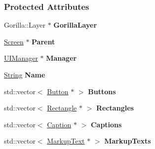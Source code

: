 \subsubsection*{Protected Attributes}
\begin{DoxyCompactItemize}
\item 
\hypertarget{classphys_1_1UI_1_1Layer_a2070c97455f89015d36f2c84f4153369}{
Gorilla::Layer $\ast$ {\bfseries GorillaLayer}}
\label{classphys_1_1UI_1_1Layer_a2070c97455f89015d36f2c84f4153369}

\item 
\hypertarget{classphys_1_1UI_1_1Layer_a1339f7386d3540d6025417d3d2d5c6e3}{
\hyperlink{classphys_1_1UI_1_1Screen}{Screen} $\ast$ {\bfseries Parent}}
\label{classphys_1_1UI_1_1Layer_a1339f7386d3540d6025417d3d2d5c6e3}

\item 
\hypertarget{classphys_1_1UI_1_1Layer_a7f735d502a8673b9faff0cbe773392c5}{
\hyperlink{classphys_1_1UIManager}{UIManager} $\ast$ {\bfseries Manager}}
\label{classphys_1_1UI_1_1Layer_a7f735d502a8673b9faff0cbe773392c5}

\item 
\hypertarget{classphys_1_1UI_1_1Layer_a0e543975ce2486ef466f3a6a2200d717}{
\hyperlink{namespacephys_aa03900411993de7fbfec4789bc1d392e}{String} {\bfseries Name}}
\label{classphys_1_1UI_1_1Layer_a0e543975ce2486ef466f3a6a2200d717}

\item 
\hypertarget{classphys_1_1UI_1_1Layer_a2d12e01d6a76ad0a101022fee53a79b7}{
std::vector$<$ \hyperlink{classphys_1_1UI_1_1Button}{Button} $\ast$ $>$ {\bfseries Buttons}}
\label{classphys_1_1UI_1_1Layer_a2d12e01d6a76ad0a101022fee53a79b7}

\item 
\hypertarget{classphys_1_1UI_1_1Layer_a4202cdc63f923bb1e54989fedd1d98bc}{
std::vector$<$ \hyperlink{classphys_1_1UI_1_1Rectangle}{Rectangle} $\ast$ $>$ {\bfseries Rectangles}}
\label{classphys_1_1UI_1_1Layer_a4202cdc63f923bb1e54989fedd1d98bc}

\item 
\hypertarget{classphys_1_1UI_1_1Layer_a758d8888e65e3f2c6ebd83acc9e93cb2}{
std::vector$<$ \hyperlink{classphys_1_1UI_1_1Caption}{Caption} $\ast$ $>$ {\bfseries Captions}}
\label{classphys_1_1UI_1_1Layer_a758d8888e65e3f2c6ebd83acc9e93cb2}

\item 
\hypertarget{classphys_1_1UI_1_1Layer_acb81eeceade2327d972cb8c91dfa31db}{
std::vector$<$ \hyperlink{classphys_1_1UI_1_1MarkupText}{MarkupText} $\ast$ $>$ {\bfseries MarkupTexts}}
\label{classphys_1_1UI_1_1Layer_acb81eeceade2327d972cb8c91dfa31db}


\end{DoxyCompactItemize}
